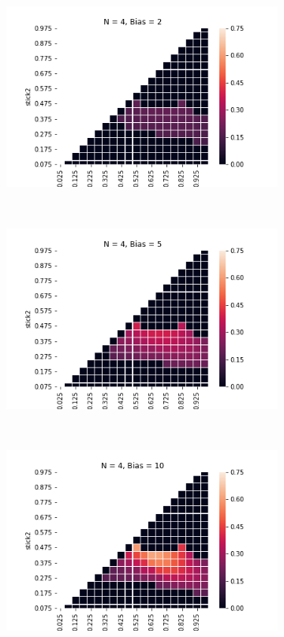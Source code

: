 \documentclass[10pt,letterpaper]{article}
\begin{document}
\begin{figure}[h]
\begin{subfigure}{0.3\linewidth}
	\includegraphics[width=\linewidth]{figures/nSticks4bias2.png}
\end{subfigure}
~
\begin{subfigure}{0.3\linewidth}
	\includegraphics[width=\linewidth]{figures/nSticks4bias5.png}
\end{subfigure}
~
\begin{subfigure}{0.3\linewidth}
	\includegraphics[width=\linewidth]{figures/nSticks4bias10.png}
\end{subfigure}


\end{figure}
\end{document}
